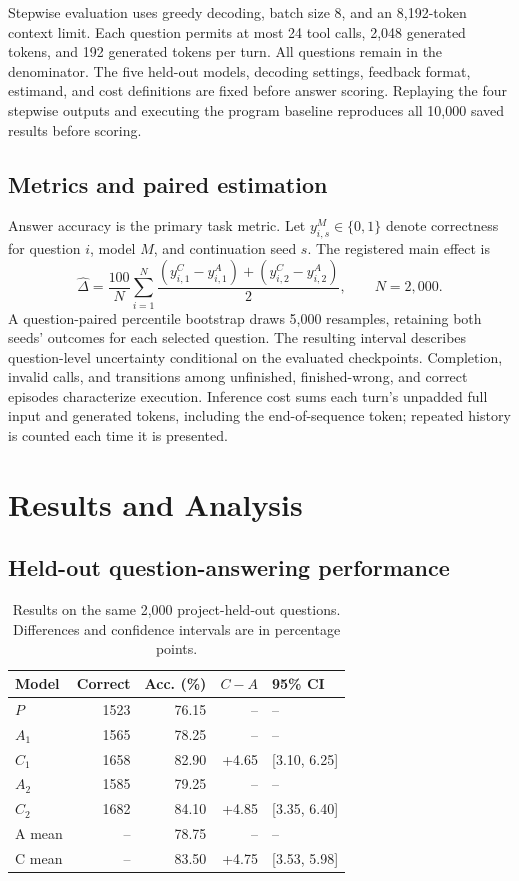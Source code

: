 \documentclass[runningheads]{llncs}
\begin{document}
Stepwise evaluation uses greedy decoding, batch size 8, and an 8,192-token context limit. Each question permits at most 24 tool calls, 2,048 generated tokens, and 192 generated tokens per turn. All questions remain in the denominator. The five held-out models, decoding settings, feedback format, estimand, and cost definitions are fixed before answer scoring. Replaying the four stepwise outputs and executing the program baseline reproduces all 10,000 saved results before scoring.

\subsection{Metrics and paired estimation}

Answer accuracy is the primary task metric. Let $y_{i,s}^M\in\{0,1\}$ denote correctness for question $i$, model $M$, and continuation seed $s$. The registered main effect is
\begin{equation}
 \widehat\Delta=\frac{100}{N}\sum_{i=1}^{N}
 \frac{(y_{i,1}^{C}-y_{i,1}^{A})+(y_{i,2}^{C}-y_{i,2}^{A})}{2},
 \qquad N=2{,}000.
\end{equation}
A question-paired percentile bootstrap draws 5,000 resamples, retaining both seeds' outcomes for each selected question. The resulting interval describes question-level uncertainty conditional on the evaluated checkpoints. Completion, invalid calls, and transitions among unfinished, finished-wrong, and correct episodes characterize execution. Inference cost sums each turn's unpadded full input and generated tokens, including the end-of-sequence token; repeated history is counted each time it is presented.

\section{Results and Analysis}

\subsection{Held-out question-answering performance}

\begin{table}[htbp]
 \centering
 \caption{Results on the same 2,000 project-held-out questions. Differences and confidence intervals are in percentage points.}
 \label{tab:main-en}
 \begin{tabular}{@{}lrrrl@{}}
\toprule
Model & Correct & Acc. (\%) & $C-A$ & 95\% CI \\
\midrule
$P$ & 1523 & 76.15 & -- & -- \\
$A_{1}$ & 1565 & 78.25 & -- & -- \\
$C_{1}$ & 1658 & 82.90 & +4.65 & [3.10, 6.25] \\
$A_{2}$ & 1585 & 79.25 & -- & -- \\
$C_{2}$ & 1682 & 84.10 & +4.85 & [3.35, 6.40] \\
A mean & -- & 78.75 & -- & -- \\
C mean & -- & 83.50 & +4.75 & [3.53, 5.98] \\
\bottomrule
\end{tabular}
\end{table}
\end{document}
